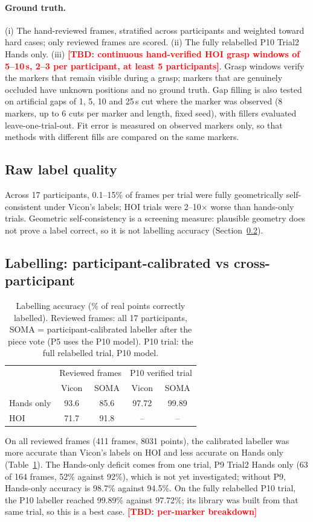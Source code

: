 \documentclass[11pt,a4paper]{article}
\newcommand{\tbd}[1]{\textcolor{red}{\textbf{[TBD: #1]}}}
\begin{document}
\paragraph{Ground truth.} (i) The hand-reviewed frames, stratified across participants and weighted toward hard
cases; only reviewed frames are scored. (ii) The fully relabelled P10 Trial2 Hands only. (iii) \tbd{continuous
hand-verified HOI grasp windows of 5--10\,s, 2--3 per participant, at least 5 participants}. Grasp windows verify the
markers that remain visible during a grasp; markers that are genuinely occluded have unknown positions and no ground
truth. Gap filling is also tested
on artificial gaps of 1, 5, 10 and 25\,s cut where the marker was observed (8 markers, up to 6 cuts per marker and
length, fixed seed), with fillers evaluated leave-one-trial-out. Fit error is measured on observed markers only, so that
methods with different fills are compared on the same markers.

\subsection{Raw label quality}
Across 17 participants, 0.1--15\% of frames per trial were fully geometrically self-consistent under Vicon's labels;
HOI trials were 2--10$\times$ worse than hands-only trials. Geometric self-consistency is a screening measure:
plausible geometry does not prove a label correct, so it is not labelling accuracy (Section~\ref{sec:val-label}).

\subsection{Labelling: participant-calibrated vs cross-participant}\label{sec:val-label}
\begin{table}[h]\centering\small
\caption{Labelling accuracy (\% of real points correctly labelled). Reviewed frames: all 17 participants, SOMA =
participant-calibrated labeller after the piece vote (P5 uses the P10 model). P10 trial: the full relabelled trial, P10
model.}\label{tab:labelling}
\begin{tabular}{lcccc}\toprule
 & \multicolumn{2}{c}{Reviewed frames} & \multicolumn{2}{c}{P10 verified trial} \\
 & Vicon & SOMA & Vicon & SOMA \\\midrule
Hands only & 93.6 & 85.6 & 97.72 & 99.89 \\
HOI & 71.7 & 91.8 & -- & -- \\\bottomrule
\end{tabular}
\end{table}
On all reviewed frames (411 frames, 8031 points), the calibrated labeller was more accurate than Vicon's labels on
HOI and less accurate on Hands only (Table~\ref{tab:labelling}). The Hands-only deficit comes from one trial, P9
Trial2 Hands only (63 of 164 frames, 52\% against 92\%), which is not yet investigated; without P9, Hands-only accuracy
is 98.7\% against 94.5\%. On the fully relabelled P10 trial, the P10 labeller reached 99.89\% against 97.72\%; its
library was built from that same trial, so this is a best case. \tbd{per-marker breakdown}
\end{document}
